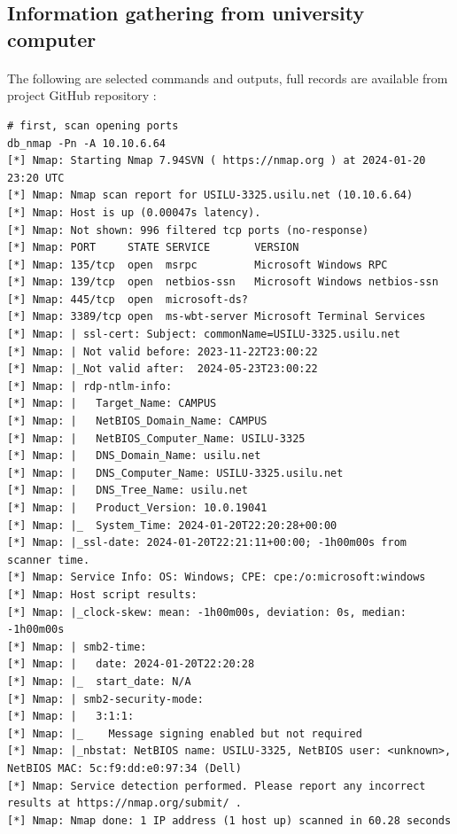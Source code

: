 \documentclass[mscthesis]{usiinfthesis}
\begin{document}
\subsection{Information gathering from university computer}
\paragraph{}
The following are selected commands and outputs, full records are available from project GitHub repository \citep{hood:github}:

\begin{lstlisting}[language={},frame=single,breaklines=true,postbreak=\mbox{\textcolor{red}{$\hookrightarrow$}\space}]
# first, scan opening ports
db_nmap -Pn -A 10.10.6.64
[*] Nmap: Starting Nmap 7.94SVN ( https://nmap.org ) at 2024-01-20 23:20 UTC
[*] Nmap: Nmap scan report for USILU-3325.usilu.net (10.10.6.64)
[*] Nmap: Host is up (0.00047s latency).
[*] Nmap: Not shown: 996 filtered tcp ports (no-response)
[*] Nmap: PORT     STATE SERVICE       VERSION
[*] Nmap: 135/tcp  open  msrpc         Microsoft Windows RPC
[*] Nmap: 139/tcp  open  netbios-ssn   Microsoft Windows netbios-ssn
[*] Nmap: 445/tcp  open  microsoft-ds?
[*] Nmap: 3389/tcp open  ms-wbt-server Microsoft Terminal Services
[*] Nmap: | ssl-cert: Subject: commonName=USILU-3325.usilu.net
[*] Nmap: | Not valid before: 2023-11-22T23:00:22
[*] Nmap: |_Not valid after:  2024-05-23T23:00:22
[*] Nmap: | rdp-ntlm-info:
[*] Nmap: |   Target_Name: CAMPUS
[*] Nmap: |   NetBIOS_Domain_Name: CAMPUS
[*] Nmap: |   NetBIOS_Computer_Name: USILU-3325
[*] Nmap: |   DNS_Domain_Name: usilu.net
[*] Nmap: |   DNS_Computer_Name: USILU-3325.usilu.net
[*] Nmap: |   DNS_Tree_Name: usilu.net
[*] Nmap: |   Product_Version: 10.0.19041
[*] Nmap: |_  System_Time: 2024-01-20T22:20:28+00:00
[*] Nmap: |_ssl-date: 2024-01-20T22:21:11+00:00; -1h00m00s from scanner time.
[*] Nmap: Service Info: OS: Windows; CPE: cpe:/o:microsoft:windows
[*] Nmap: Host script results:
[*] Nmap: |_clock-skew: mean: -1h00m00s, deviation: 0s, median: -1h00m00s
[*] Nmap: | smb2-time:
[*] Nmap: |   date: 2024-01-20T22:20:28
[*] Nmap: |_  start_date: N/A
[*] Nmap: | smb2-security-mode:
[*] Nmap: |   3:1:1:
[*] Nmap: |_    Message signing enabled but not required
[*] Nmap: |_nbstat: NetBIOS name: USILU-3325, NetBIOS user: <unknown>, NetBIOS MAC: 5c:f9:dd:e0:97:34 (Dell)
[*] Nmap: Service detection performed. Please report any incorrect results at https://nmap.org/submit/ .
[*] Nmap: Nmap done: 1 IP address (1 host up) scanned in 60.28 seconds


\end{lstlisting}
\end{document}
